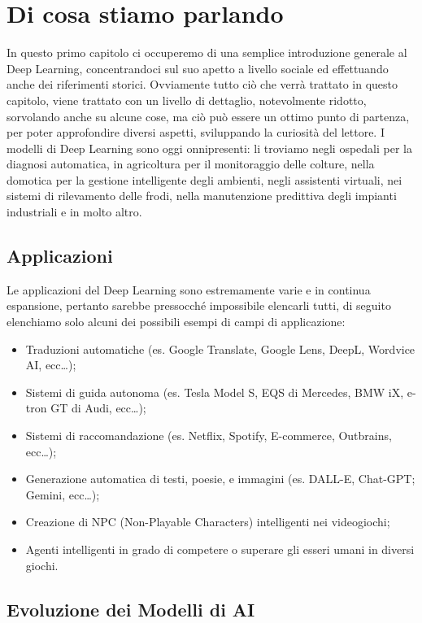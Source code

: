 \chapter{Di cosa stiamo parlando}

In questo primo capitolo ci occuperemo di una semplice introduzione generale al Deep Learning, concentrandoci sul suo apetto a livello sociale ed effettuando anche dei riferimenti storici. Ovviamente tutto ciò che verrà trattato in questo capitolo, viene trattato con un livello di dettaglio, notevolmente ridotto, sorvolando anche su alcune cose, ma ciò può essere un ottimo punto di partenza, per poter approfondire diversi aspetti, sviluppando la curiosità del lettore. I modelli di Deep Learning sono oggi onnipresenti: li troviamo negli ospedali per la diagnosi automatica, in agricoltura per il monitoraggio delle colture, nella domotica per la gestione intelligente degli ambienti, negli assistenti virtuali, nei sistemi di rilevamento delle frodi, nella manutenzione predittiva degli impianti industriali e in molto altro.

\section{Applicazioni}

Le applicazioni del Deep Learning sono estremamente varie e in continua espansione, pertanto sarebbe pressocché impossibile elencarli tutti, di seguito elenchiamo solo alcuni dei possibili esempi di campi di applicazione:

\begin{itemize}
    \item Traduzioni automatiche (es. Google Translate, Google Lens, DeepL, Wordvice AI, ecc\dots);
    \item Sistemi di guida autonoma (es. Tesla Model S, EQS di Mercedes, BMW iX, e-tron GT di Audi, ecc\dots);
    \item Sistemi di raccomandazione (es. Netflix, Spotify, E-commerce, Outbrains, ecc\dots);
    \item Generazione automatica di testi, poesie, e immagini (es. DALL-E, Chat-GPT; Gemini, ecc\dots);
    \item Creazione di NPC (Non-Playable Characters) intelligenti nei videogiochi;
    \item Agenti intelligenti in grado di competere o superare gli esseri umani in diversi giochi.
\end{itemize}

\section{Evoluzione dei Modelli di AI}

